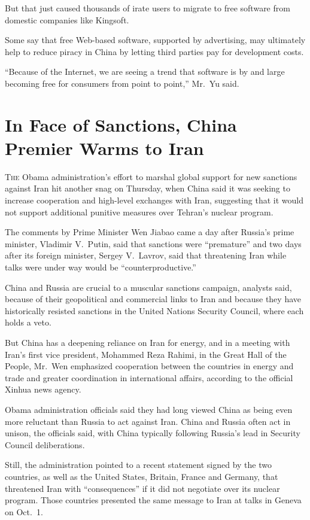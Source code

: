 ﻿\documentclass[12pt]{article}
\begin{document}
But that just caused thousands of irate users to migrate to free software from domestic companies
like Kingsoft.

Some say that free Web-based software, supported by advertising, may ultimately help to reduce
piracy in China by letting third parties pay for development costs.

``Because of the Internet, we are seeing a trend that software is by and large becoming free for
consumers from point to point,'' Mr.~Yu said.

\section{In Face of Sanctions, China Premier Warms to Iran}

\lettrine{T}{he} Obama administration's effort to marshal\cite{marshal}
global support for new sanctions against Iran hit another snag on Thursday, when China said it was
seeking to increase cooperation and high-level exchanges with Iran, suggesting that it would not
support additional punitive measures over Tehran's nuclear program.

The comments by Prime Minister Wen Jiabao came a day after Russia's prime minister, Vladimir
V.~Putin, said that sanctions were ``premature'' and two days after its foreign minister, Sergey
V.~Lavrov, said that threatening Iran while talks were under way would be ``counterproductive.''

China and Russia are crucial to a muscular sanctions campaign, analysts said, because of their
geopolitical and commercial links to Iran and because they have historically resisted sanctions in
the United Nations Security Council, where each holds a veto.

But China has a deepening reliance on Iran for energy, and in a meeting with Iran's first vice
president, Mohammed Reza Rahimi, in the Great Hall of the People, Mr.~Wen emphasized cooperation
between the countries in energy and trade and greater coordination in international affairs,
according to the official Xinhua news agency.

Obama administration officials said they had long viewed China as being even more reluctant than
Russia to act against Iran. China and Russia often act in unison, the officials said, with China
typically following Russia's lead in Security Council deliberations.

Still, the administration pointed to a recent statement signed by the two countries, as well as the
United States, Britain, France and Germany, that threatened Iran with ``consequences'' if it did not
negotiate over its nuclear program. Those countries presented the same message to Iran at talks in
Geneva on Oct.~1.
\end{document}
